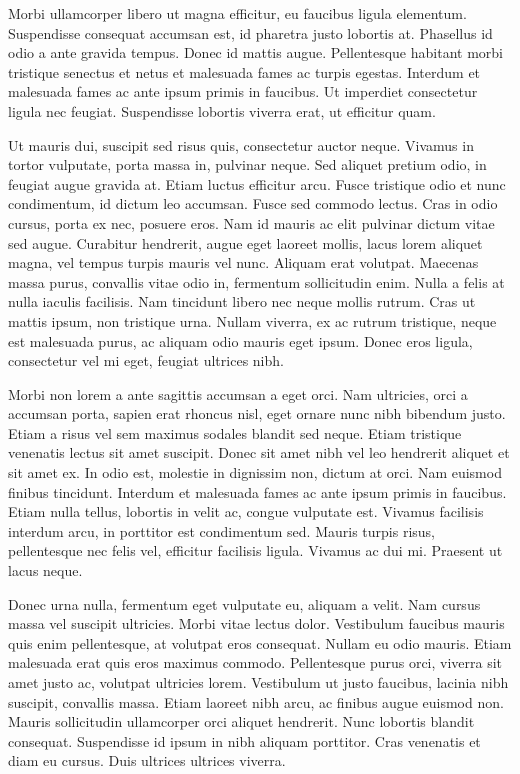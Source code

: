 Morbi ullamcorper libero ut magna efficitur, eu faucibus ligula elementum. Suspendisse consequat accumsan est, id pharetra justo lobortis at. Phasellus id odio a ante gravida tempus. Donec id mattis augue. Pellentesque habitant morbi tristique senectus et netus et malesuada fames ac turpis egestas. Interdum et malesuada fames ac ante ipsum primis in faucibus. Ut imperdiet consectetur ligula nec feugiat. Suspendisse lobortis viverra erat, ut efficitur quam.

Ut mauris dui, suscipit sed risus quis, consectetur auctor neque. Vivamus in tortor vulputate, porta massa in, pulvinar neque. Sed aliquet pretium odio, in feugiat augue gravida at. Etiam luctus efficitur arcu. Fusce tristique odio et nunc condimentum, id dictum leo accumsan. Fusce sed commodo lectus. Cras in odio cursus, porta ex nec, posuere eros. Nam id mauris ac elit pulvinar dictum vitae sed augue. Curabitur hendrerit, augue eget laoreet mollis, lacus lorem aliquet magna, vel tempus turpis mauris vel nunc. Aliquam erat volutpat. Maecenas massa purus, convallis vitae odio in, fermentum sollicitudin enim. Nulla a felis at nulla iaculis facilisis. Nam tincidunt libero nec neque mollis rutrum. Cras ut mattis ipsum, non tristique urna. Nullam viverra, ex ac rutrum tristique, neque est malesuada purus, ac aliquam odio mauris eget ipsum. Donec eros ligula, consectetur vel mi eget, feugiat ultrices nibh.

Morbi non lorem a ante sagittis accumsan a eget orci. Nam ultricies, orci a accumsan porta, sapien erat rhoncus nisl, eget ornare nunc nibh bibendum justo. Etiam a risus vel sem maximus sodales blandit sed neque. Etiam tristique venenatis lectus sit amet suscipit. Donec sit amet nibh vel leo hendrerit aliquet et sit amet ex. In odio est, molestie in dignissim non, dictum at orci. Nam euismod finibus tincidunt. Interdum et malesuada fames ac ante ipsum primis in faucibus. Etiam nulla tellus, lobortis in velit ac, congue vulputate est. Vivamus facilisis interdum arcu, in porttitor est condimentum sed. Mauris turpis risus, pellentesque nec felis vel, efficitur facilisis ligula. Vivamus ac dui mi. Praesent ut lacus neque.

Donec urna nulla, fermentum eget vulputate eu, aliquam a velit. Nam cursus massa vel suscipit ultricies. Morbi vitae lectus dolor. Vestibulum faucibus mauris quis enim pellentesque, at volutpat eros consequat. Nullam eu odio mauris. Etiam malesuada erat quis eros maximus commodo. Pellentesque purus orci, viverra sit amet justo ac, volutpat ultricies lorem. Vestibulum ut justo faucibus, lacinia nibh suscipit, convallis massa. Etiam laoreet nibh arcu, ac finibus augue euismod non. Mauris sollicitudin ullamcorper orci aliquet hendrerit. Nunc lobortis blandit consequat. Suspendisse id ipsum in nibh aliquam porttitor. Cras venenatis et diam eu cursus. Duis ultrices ultrices viverra.

